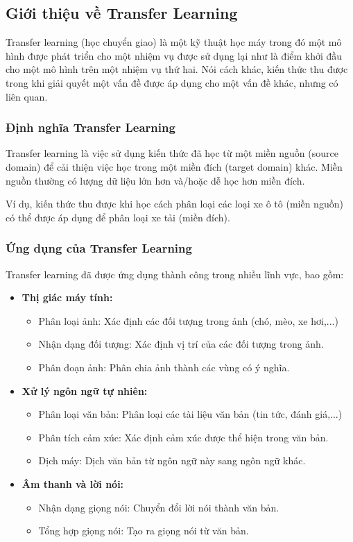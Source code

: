 \subsection{Giới thiệu về Transfer Learning}

Transfer learning (học chuyển giao) là một kỹ thuật học máy trong đó một mô hình được phát triển cho một nhiệm vụ được sử dụng lại như là điểm khởi đầu cho một mô hình trên một nhiệm vụ thứ hai. Nói cách khác, kiến thức thu được trong khi giải quyết một vấn đề được áp dụng cho một vấn đề khác, nhưng có liên quan. 

\subsubsection{Định nghĩa Transfer Learning}

Transfer learning là việc sử dụng kiến thức đã học từ một miền nguồn (source domain) để cải thiện việc học trong một miền đích (target domain) khác. Miền nguồn thường có lượng dữ liệu lớn hơn và/hoặc dễ học hơn miền đích. 

Ví dụ, kiến thức thu được khi học cách phân loại các loại xe ô tô (miền nguồn) có thể được áp dụng để phân loại xe tải (miền đích).

\subsubsection{Ứng dụng của Transfer Learning}

Transfer learning đã được ứng dụng thành công trong nhiều lĩnh vực, bao gồm:

\begin{itemize}
    \item \textbf{Thị giác máy tính:} 
        \begin{itemize}
            \item Phân loại ảnh: Xác định các đối tượng trong ảnh (chó, mèo, xe hơi,...)
            \item Nhận dạng đối tượng: Xác định vị trí của các đối tượng trong ảnh.
            \item Phân đoạn ảnh: Phân chia ảnh thành các vùng có ý nghĩa.
        \end{itemize}
    \item \textbf{Xử lý ngôn ngữ tự nhiên:}
        \begin{itemize}
            \item Phân loại văn bản: Phân loại các tài liệu văn bản (tin tức, đánh giá,...)
            \item Phân tích cảm xúc: Xác định cảm xúc được thể hiện trong văn bản.
            \item Dịch máy: Dịch văn bản từ ngôn ngữ này sang ngôn ngữ khác.
        \end{itemize}
    \item \textbf{Âm thanh và lời nói:}
        \begin{itemize}
            \item Nhận dạng giọng nói: Chuyển đổi lời nói thành văn bản.
            \item Tổng hợp giọng nói: Tạo ra giọng nói từ văn bản.
        \end{itemize}
\end{itemize}

